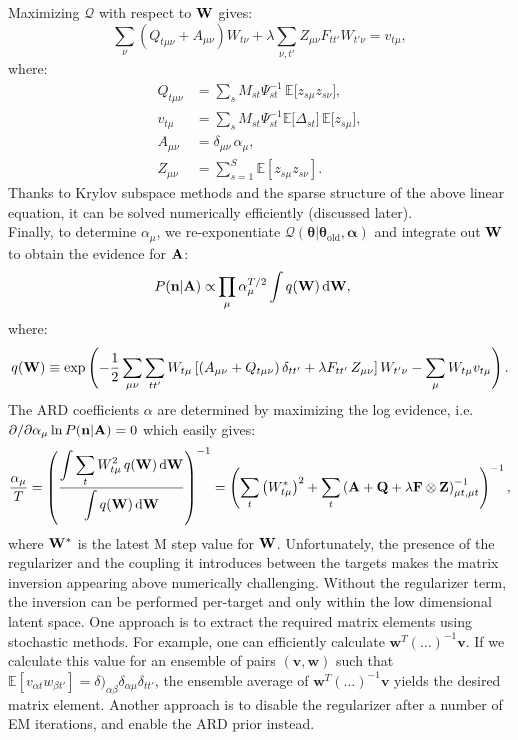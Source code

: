 \documentclass[nofootinbib,amssymb,amsmath]{revtex4}
\newcommand{\vn}{{\bf n}}
\newcommand{\vQ}{{\bf Q}}
\newcommand{\vW}{{\bf W}}
\newcommand{\vF}{{\bf F}}
\newcommand{\vZ}{{\bf Z}}
\newcommand{\vtheta}{{\boldsymbol \theta}}
\newcommand{\valpha}{{\boldsymbol \alpha}}
\newcommand{\vA}{{\bf A}}
\newcommand{\EE}{\mathbb{E}}
\begin{document}
\noindent Maximizing $\mathcal{Q}$ with respect to $\vW$ gives:
\begin{equation}\label{eq:W_eq_reg}
\sum_{\nu} \left(Q_{t\mu\nu} + A_{\mu\nu}\right) W_{t\nu} + \lambda \sum_{\nu,t'} Z_{\mu\nu} F_{tt'} W_{t'\nu} = v_{t\mu},
\end{equation}
where:
\begin{align}
Q_{t\mu\nu} &= \sum_s M_{st} \Psi_{st}^{-1} \, \EE\big[z_{s\mu} z_{s\nu}\big],\nonumber\\
v_{t\mu} &= \sum_s M_{st} \Psi_{st}^{-1} \EE\big[\Delta_{st}\big]\, \EE\big[z_{s\mu}\big],\nonumber\\
A_{\mu\nu} &= \delta_{\mu\nu}\,\alpha_{\mu},\nonumber\\
Z_{\mu\nu} &= \sum_{s=1}^S \EE[z_{s\mu} z_{s\nu}].
\end{align}
Thanks to Krylov subspace methods and the sparse structure of the above linear equation, it can be solved numerically efficiently (discussed later).\\

\noindent Finally, to determine $\alpha_\mu$, we re-exponentiate $\mathcal{Q}(\vtheta|\vtheta_\mathrm{old}, \valpha)$ and integrate out $\vW$ to obtain the evidence for $\vA$:
%
\begin{align}
P(\vn | \vA) \propto& \prod_\mu \alpha_\mu^{T/2} \int q(\vW) \, \mathrm{d} \vW,
\label{ARD_evidence}
\end{align}
where:
\begin{equation}
q(\vW) \equiv \exp\left(-\frac{1}{2} \sum_{\mu\nu} \sum_{tt'} W_{t \mu} \left[\left(A_{\mu\nu} + Q_{t\mu\nu}\right)\delta_{tt'} + \lambda F_{tt'}\,Z_{\mu\nu}\right] W_{t' \nu} - \sum_\mu W_{t\mu} v_{t\mu}\right).
\end{equation}
%
The ARD coefficients $\alpha$ are determined by maximizing the log evidence, i.e. $\partial/\partial \alpha_\mu \ln P(\vn | \vA) = 0$ which easily gives:
\begin{equation}
\frac{\alpha_\mu}{T} = \left(\frac{\displaystyle\int \sum_t W^2_{t\mu}\, q(\vW)\,\mathrm{d}\vW}{\displaystyle\int q(\vW) \, \mathrm{d}\vW}\right)^{-1} = \left(\sum_t \left(W_{t\mu}^*\right)^2 + \sum_t\left(\vA + \vQ + \lambda \vF \otimes \vZ \right)^{-1}_{\mu t, \mu t}\right)^{-1},
\end{equation}
where $\vW^*$ is the latest M step value for $\vW$. Unfortunately, the presence of the regularizer and the coupling it introduces between the targets makes the matrix inversion appearing above numerically challenging. Without the regularizer term, the inversion can be performed per-target and only within the low dimensional latent space. One approach is to extract the required matrix elements using stochastic methods. For example, one can efficiently calculate $\mathbf{w}^T \left(\ldots\right)^{-1} \mathbf{v}$. If we calculate this value for an ensemble of pairs $(\mathbf{v}, \mathbf{w})$ such that $\EE[v_{\alpha t} w_{\beta t'}] = \delta)_{\alpha\beta}\delta_{\alpha\mu}\delta_{tt'}$, the ensemble average of $\mathbf{w}^T \left(\ldots\right)^{-1} \mathbf{v}$ yields the desired matrix element. Another approach is to disable the regularizer after a number of EM iterations, and enable the ARD prior instead.
\end{document}
